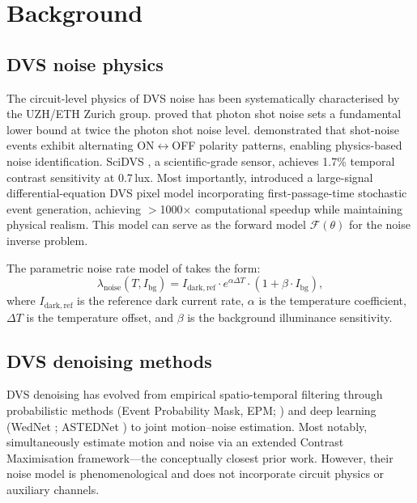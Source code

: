 \documentclass[twocolumn]{article}
\begin{document}
\section{Background}
\label{sec:background}

\subsection{DVS noise physics}

The circuit-level physics of DVS noise has been systematically characterised by the UZH/ETH Zurich group.
\citet{A1} proved that photon shot noise sets a fundamental lower bound at twice the photon shot noise level.
\citet{A2} demonstrated that shot-noise events exhibit alternating ON$\leftrightarrow$OFF polarity patterns, enabling physics-based noise identification.
SciDVS \citep{A3}, a scientific-grade sensor, achieves 1.7\% temporal contrast sensitivity at 0.7\,lux.
Most importantly, \citet{A5} introduced a large-signal differential-equation DVS pixel model incorporating first-passage-time stochastic event generation, achieving $>$1000$\times$ computational speedup while maintaining physical realism.
This model can serve as the forward model $\mathcal{F}(\theta)$ for the noise inverse problem.

The parametric noise rate model of \citet{A5} takes the form:
\begin{equation}
  \lambda_\mathrm{noise}(T, I_\mathrm{bg}) = I_\mathrm{dark,ref} \cdot e^{\alpha \Delta T} \cdot (1 + \beta \cdot I_\mathrm{bg}),
  \label{eq:a5model}
\end{equation}
where $I_\mathrm{dark,ref}$ is the reference dark current rate, $\alpha$ is the temperature coefficient, $\Delta T$ is the temperature offset, and $\beta$ is the background illuminance sensitivity.

\subsection{DVS denoising methods}

DVS denoising has evolved from empirical spatio-temporal filtering \citep{B1,B2} through probabilistic methods (Event Probability Mask, EPM; \citealt{B3}) and deep learning (WedNet \citealt{B5}; ASTEDNet \citealt{B6}) to joint motion--noise estimation.
Most notably, \citet{B7} simultaneously estimate motion and noise via an extended Contrast Maximisation framework---the conceptually closest prior work.
However, their noise model is phenomenological and does not incorporate circuit physics or auxiliary channels.
\end{document}
